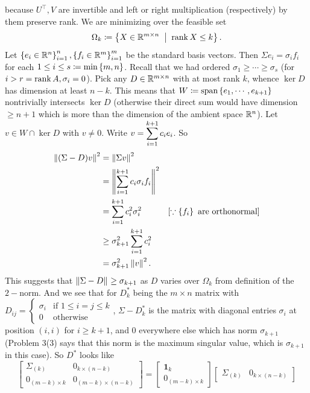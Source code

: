 \begin{enumerate}[leftmargin=*]
because $U^\top, V$ are invertible and left or right multiplication (respectively) by them preserve rank. We are minimizing over the feasible set $$\Omega_k \sett \set{X\in \R^{m\times n}\st \rk X \leq k}.$$ Let $\left\{e_i\in\mathbb{R}^n\right\}_{i=1}^n, \left\{f_i\in\mathbb{R}^m\right\}_{i=1}^m$ be the standard basis vectors. Then $\Sigma e_i = \sigma_if_i$ for each $ 1\leq i\leq s\coloneqq\min\left\{m,n\right\}$. Recall that we had ordered $\sigma_1\geq \cdots\geq \sigma_s$ (for $i>r=\operatorname{rank} A, \sigma_i=0$). Pick any $D\in\mathbb{R}^{m\times n}$ with at most rank $k$, whence $\ker D$ has dimension at least $n-k$. This means that $W\coloneqq \text{span}\left\{e_1,\cdots,e_{k+1}\right\}$ nontrivially intersects $\ker D$ (otherwise their direct sum would have dimension $\geq n+1$ which is more than the dimension of the ambient space $\mathbb{R}^n$). Let $v\in W\cap\ker D$ with $v\neq 0$. Write $\displaystyle v=\sum_{i=1}^{k+1}c_i e_i$. So \begin{align*}
\left\lVert (\Sigma-D)v \right\rVert_{}^2 &= \left\lVert \Sigma v \right\rVert_{}^2 \\
&= \left\lVert \sum_{i=1}^{k+1}c_i\sigma_i f_i \right\rVert_{}^2 \\
&= \sum_{i=1}^{k+1}c_i^2\sigma_i^2 & [\because \left\{f_i\right\} \text{ are orthonormal}]\\
&\geq \sigma_{k+1}^2 \sum_{i=1}^{k+1}c_i^2\\&=\sigma_{k+1}^2\left\lVert v \right\rVert_{}^2.
\end{align*}
This suggests that $\left\lVert \Sigma-D \right\rVert_{}\geq \sigma_{k+1}$ as $D$ varies over $\Omega_k$ from definition of the $2-$norm. And we see that for $D_k^*$ being the $m\times n$ matrix with $D_{ij}=\begin{cases} \sigma_i&\text{if } 1\leq i=j\leq k\\0&\text{otherwise}
\end{cases}$, $\Sigma-D_k^*$ is the matrix with diagonal entries $\sigma_i$ at position $(i,i)$ for $i\geq k+1$, and $0$ everywhere else which has norm $\sigma_{k+1}$ (Problem 3(3) says that this norm is the maximum singular value, which is $\sigma_{k+1}$ in this case). So $D^*$ looks like $$ \begin{bmatrix}
\Sigma_{(k)} & 0_{k\times(n-k)}\\0_{(m-k)\times k}&0_{(m-k)\times(n-k)}
\end{bmatrix}=
\begin{bmatrix}
\pmb 1_{k} \\0_{(m-k)\times k}
\end{bmatrix}
\begin{bmatrix}
\Sigma_{(k)} & 0_{k\times(n-k)}
\end{bmatrix}
$$
\end{enumerate}
